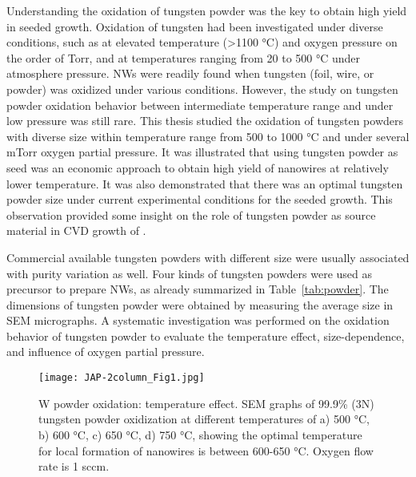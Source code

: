 Understanding the oxidation of tungsten powder was the key to obtain high yield in seeded growth. Oxidation of tungsten had been investigated under diverse conditions, such as at elevated temperature (\textgreater 1100 \si{\degreeCelsius}) and oxygen pressure on the order of Torr,\cite{Gulbransen1960} and at temperatures ranging from 20 to 500 \si{\degreeCelsius} under atmosphere pressure.\cite{Warren1996}  NWs were readily found when tungsten (foil, wire, or powder) was oxidized under various conditions.\cite{Zhu1999,Karuppanan2007,Hsieh2010} However, the study on tungsten powder oxidation behavior between intermediate temperature range and under low pressure was still rare. This thesis studied the oxidation of tungsten powders with diverse size within temperature range from 500 to 1000 \si{\degreeCelsius} and under several mTorr oxygen partial pressure. It was illustrated that using tungsten powder as seed was an economic approach to obtain high yield of  nanowires at relatively lower temperature. It was also demonstrated that there was an optimal tungsten powder size under current experimental conditions for the seeded growth. This observation provided some insight on the role of tungsten powder as source material in CVD growth of .

Commercial available tungsten powders with different size were usually associated with purity variation as well. Four kinds of tungsten powders were used as precursor to prepare  NWs, as already summarized in Table~\ref{tab:powder}. The dimensions of tungsten powder were obtained by measuring the average size in SEM micrographs. A systematic investigation was performed on the oxidation behavior of tungsten powder to evaluate the temperature effect, size-dependence, and influence of oxygen partial pressure.

\begin{figure}[htb]
\centering
\texttt{[image: JAP-2column\_Fig1.jpg]}
\caption[W powder oxidation: temperature effect]{W powder oxidation: temperature effect. SEM graphs of 99.9\% (3N) tungsten powder oxidization at different temperatures of a) 500 \si{\degreeCelsius}, b) 600 \si{\degreeCelsius}, c) 650 \si{\degreeCelsius}, d) 750 \si{\degreeCelsius}, showing the optimal temperature for local formation of nanowires is between 600-650 \si{\degreeCelsius}. Oxygen flow rate is 1 sccm.}
\label{fig:pdtemp}
\end{figure}

